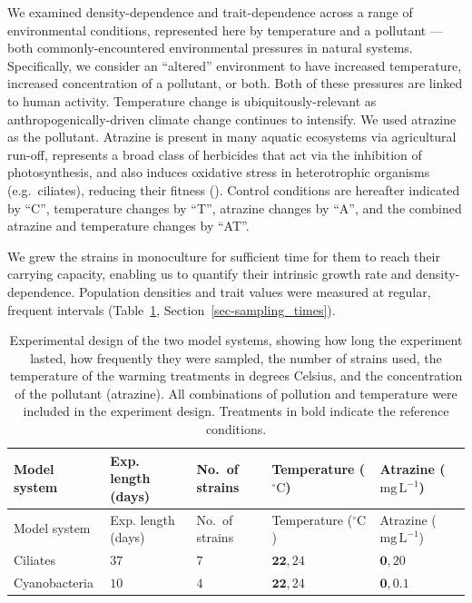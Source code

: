 \documentclass[
  letterpaper,
  DIV=11,
  numbers=noendperiod]{scrartcl}
\begin{document}
We examined density-dependence and trait-dependence across a range of
environmental conditions, represented here by temperature and a
pollutant --- both commonly-encountered environmental pressures in
natural systems. Specifically, we consider an ``altered'' environment to
have increased temperature, increased concentration of a pollutant, or
both. Both of these pressures are linked to human activity. Temperature
change is ubiquitously-relevant as anthropogenically-driven climate
change continues to intensify. We used atrazine as the pollutant.
Atrazine is present in many aquatic ecosystems via agricultural run-off,
represents a broad class of herbicides that act via the inhibition of
photosynthesis, and also induces oxidative stress in heterotrophic
organisms (e.g.~ciliates), reducing their fitness
(). Control conditions are
hereafter indicated by ``C'', temperature changes by ``T'', atrazine
changes by ``A'', and the combined atrazine and temperature changes by
``AT''.

We grew the strains in monoculture for sufficient time for them to reach
their carrying capacity, enabling us to quantify their intrinsic growth
rate and density-dependence. Population densities and trait values were
measured at regular, frequent intervals
(Table~\ref{tbl-treatment-table}, Section~\ref{sec-sampling_times}).

\begin{longtable}[]{@{}lllll@{}}
\caption{Experimental design of the two model systems, showing how long
the experiment lasted, how frequently they were sampled, the number of
strains used, the temperature of the warming treatments in degrees
Celsius, and the concentration of the pollutant (atrazine). All
combinations of pollution and temperature were included in the
experiment design. Treatments in bold indicate the reference
conditions.}\label{tbl-treatment-table}\tabularnewline
\toprule\noalign{}
Model system & Exp. length (days) & No.~of strains & Temperature
(\(\mathrm{^\circ C}\)) & Atrazine (\(\mathrm{mg\,L}^{-1}\)) \\
\midrule\noalign{}
\endfirsthead
\toprule\noalign{}
Model system & Exp. length (days) & No.~of strains & Temperature
(\(\mathrm{^\circ C}\)) & Atrazine (\(\mathrm{mg\,L}^{-1}\)) \\
\midrule\noalign{}
\endhead
\bottomrule\noalign{}
\endlastfoot
Ciliates & \(37\) & \(7\) & \(\mathbf{22}, 24\) & \(\mathbf{0}, 20\) \\
Cyanobacteria & \(10\) & \(4\) & \(\mathbf{22}, 24\) &
\(\mathbf{0}, 0.1\) \\
\end{longtable}
\end{document}
